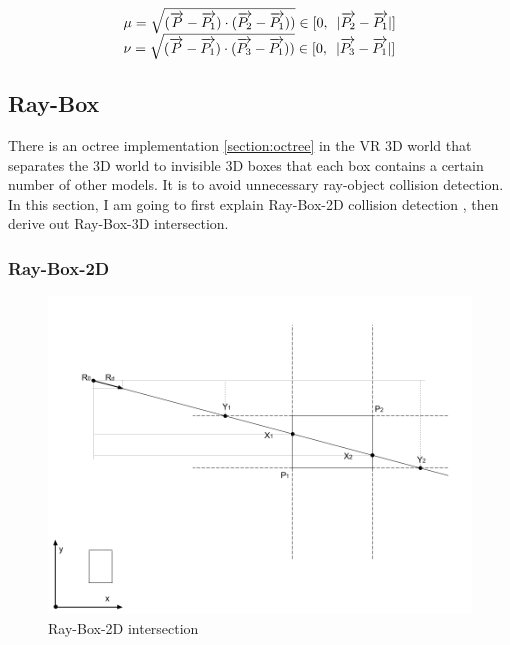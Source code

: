 \[
\begin{array}{lr}
\mu = \sqrt{(\overrightarrow{P} - \overrightarrow{P_1}) \cdot (\overrightarrow{P_2} - \overrightarrow{P_1}))} \in [0,\enspace\lvert \overrightarrow{P_2} - \overrightarrow{P_1} \rvert]\\
\nu = \sqrt{(\overrightarrow{P} - \overrightarrow{P_1}) \cdot (\overrightarrow{P_3} - \overrightarrow{P_1}))} \in [0,\enspace\lvert \overrightarrow{P_3} - \overrightarrow{P_1} \rvert]\\
\end{array}
\]

\subsection{Ray-Box}

There is an octree implementation \ref{section:octree} in the VR 3D world that separates the 3D world to invisible 3D boxes that each box contains a certain number of other models. It is to avoid unnecessary ray-object collision detection. In this section, I am going to first explain Ray-Box-2D collision detection \parencite{Tavian.ray-box-2d.2011}, then derive out Ray-Box-3D intersection.

\subsubsection{Ray-Box-2D}

\begin{figure}[H]
\caption[ray-box-2d-intersection]{Ray-Box-2D intersection}
\label{fig:ray-box-2d}
\centering
\includegraphics[width=\linewidth]{Figures/ray-box-2d-intersection.png}
\decoRule
\end{figure}

